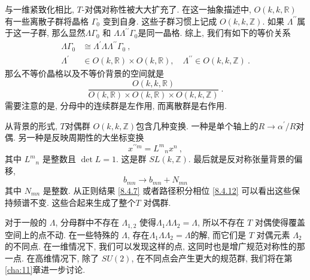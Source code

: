 与一维紧致化相比,  $T$-对偶对称性被大大扩充了. 在这一抽象描述中, $O(k, k, \mathds{R})$ 有一些离散子群将晶格 $\Gamma_{0}$ 变到自身. 
这些子群习惯上记成 $O(k, k, \mathds{Z})$. 如果 $\Lambda^{\prime \prime}$属于这一子群, 那么显然$\Lambda \Gamma_{0}$ 和 $\Lambda \Lambda^{\prime \prime} \Gamma_{0}$是同一晶格. 综上, 我们有如下的等价关系
\begin{subequations} \label{8.4.30}
\begin{align}
		\Lambda \Gamma_{0} &\cong \Lambda^{\prime} \Lambda \Lambda^{\prime \prime} \Gamma_{0} \:, \label{8.4.30a} \\
		\Lambda^{\prime} &\in O(k, \mathds{R}) \times O(k, \mathds{R}), \quad \Lambda^{\prime \prime} \in O(k, k, \mathds{Z}) \:. 
		\label{8.4.30b}
\end{align}
\end{subequations}
那么不等价晶格以及不等价背景的空间就是
\begin{equation}
	\frac{O(k, k, \mathds{R})}{O(k, \mathds{R}) \times O(k, \mathds{R}) \times O(k, k, \mathds{Z})} \:. \label{8.4.31}
\end{equation}
需要注意的是, 分母中的连续群是左作用, 而离散群是右作用. 

从背景的形式, $T$对偶群 $O(k, k, \mathds{Z})$包含几种变换. 一种是单个轴上的$R \rightarrow \alpha^{\prime} / R$对偶. 
另一种是反映周期性的大坐标变换
\begin{equation}
	x^{\prime \prime m}=L^{m}{}_{n} x^{n} \:, \label{8.4.32}
\end{equation}
其中 $L^{m}{}_{n}$ 是整数且 $\operatorname{det}L=1$. 这是群 $SL(k, \mathds{Z})$. 最后就是反对称张量背景的偏移,
\begin{equation}
	b_{m n} \rightarrow b_{m n}+N_{m n} \label{8.4.33}
\end{equation}
其中 $N_{m n}$ 是整数. 从正则结果 \eqref{8.4.7} 或者路径积分相位 \eqref{8.4.12} 可以看出这些保持频谱不变. 这些合起来生成了整个$T$ 对偶群.

对于一般的 $\Lambda$, 分母群中不存在 $\Lambda_{1,2}$ 使得$\Lambda_{1} \Lambda \Lambda_{2}=\Lambda$, 所以不存在 $T$ 对偶使得覆盖空间上的点不动. 
在一些特殊的 $\Lambda$, 存在$\Lambda_{1} \Lambda \Lambda_{2}=\Lambda$的解, 而它们是 $T$ 对偶元素 $\Lambda_{2}$的不同点. 
在一维情况下, 我们可以发现这样的点, 这同时也是增广规范对称性的那一点. 在高维情况下, 除了 $SU(2)$, 在不同点会产生更大的规范群, 我们将在第\ref{cha:11}章进一步讨论.

